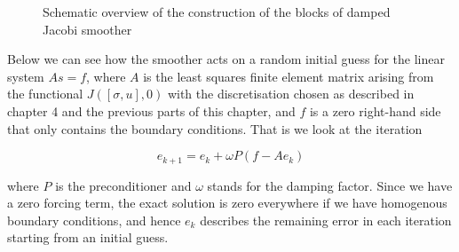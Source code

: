 \documentclass[../draft_1.tex]{subfiles}
\begin{document}
\begin{figure}[ht!]
	\centering
	\caption{Schematic overview of the construction of the blocks of damped Jacobi smoother}
\end{figure}

Below we can see how the smoother acts on a random initial guess for the linear system $As = f$, where $A$ is the least squares finite element matrix arising from the functional $J([\sigma, u], 0)$ with the discretisation chosen as described in chapter 4 and the previous parts of this chapter, and $f$ is a zero right-hand side that only contains the boundary conditions. That is we look at the iteration 
\begin{ceqn}
	\begin{equation}
	e_{k+1} = e_k + \omega P (f - Ae_k)
	\end{equation}
\end{ceqn}
where $P$ is the preconditioner and $\omega$ stands for the damping factor. Since we have a zero forcing term, the exact solution is zero everywhere if we have homogenous boundary conditions, and hence $e_k$ describes the remaining error in each iteration starting from an initial guess. 
\end{document}
